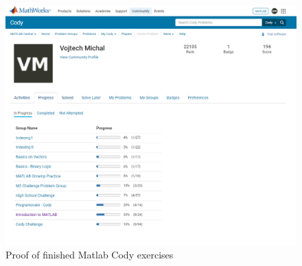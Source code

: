\begin{figure}[htbp]
    \centering
    \includegraphics[width=0.99\linewidth]{figures/3/Cody.png}
    \caption{Proof of finished Matlab Cody exercises}
    \label{fig:3-cody}
\end{figure}
